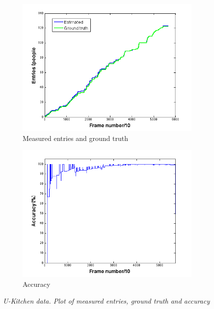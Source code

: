 \begin{figure}[h]
\centering
\begin{subfigure}{.5\textwidth}
  \centering
  \includegraphics[width=1.1\linewidth]{images/entriesGTU.png}
  \caption{Measured entries and ground truth}
  \label{fig:sub1}
\end{subfigure}%
\begin{subfigure}{.5\textwidth}
  \centering
  \includegraphics[width=1.1\linewidth]{images/accInU.png}
  \caption{Accuracy}
  \label{fig:sub2}
\end{subfigure}
\caption[U-kitchen entries]{\textit{U-Kitchen data. Plot of measured entries, ground truth and accuracy}}
\label{fig:U-kitchen entries}
\end{figure}

